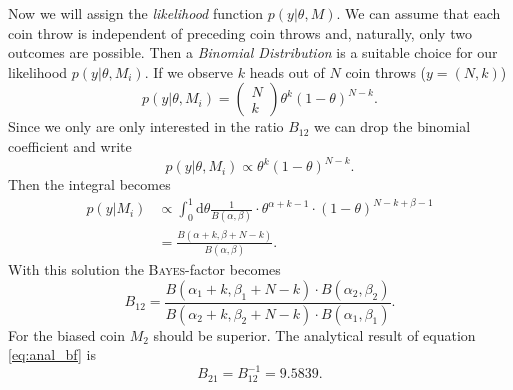 \documentclass[%
 reprint,
 amsmath,amssymb,
 aps,
]{revtex4-1}
\begin{document}
Now we will assign the \emph{likelihood} function $p(y|\theta,M)$. We can assume that each coin throw is independent of preceding coin throws and, naturally, only two outcomes are possible. Then a \emph{Binomial Distribution} is a suitable choice for our likelihood $p(y|\theta,M_i)$. If we observe $k$ heads out of $N$ coin throws ($y=(N,k)$) $$p(y|\theta,M_i)=\begin{pmatrix}N\\k
\end{pmatrix}\theta^k(1-\theta)^{N-k}.$$
Since we only are only interested in the ratio $B_{12}$ we can drop the binomial coefficient and write $$p(y|\theta, M_i)\propto \theta^k(1-\theta)^{N-k}.$$
Then the integral becomes 
\begin{align*}
	p(y|M_i)&\propto \int_{0}^{1} \text{d}\theta \frac{1}{B(\alpha,\beta)} \cdot \theta^{\alpha+k-1}\cdot (1-\theta)^{N-k+\beta-1}\\
	&=\frac{B(\alpha+k,\beta+N-k)}{B(\alpha, \beta)}.
\end{align*}
With this solution the \textsc{Bayes}-factor becomes
\begin{equation}\label{eq:anal_bf}
	B_{12}=\frac{B(\alpha_1+k,\beta_1+N-k)\cdot B(\alpha_2,\beta_2)}{B(\alpha_2+k,\beta_2+N-k)\cdot B(\alpha_1,\beta_1)}.
\end{equation}
For the biased coin $M_2$ should be superior. The analytical result of equation \eqref{eq:anal_bf} is $$B_{21}=B_{12}^{-1}=9.5839.$$
\end{document}

